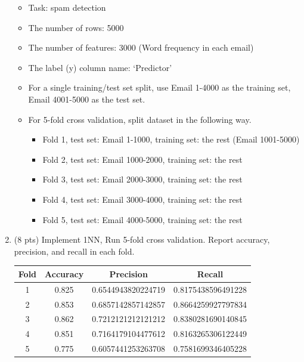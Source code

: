 \documentclass[a4paper]{article}
\theoremstyle{definition}
\newenvironment{soln}{
    \leavevmode\color{blue}\ignorespaces
}{}
\begin{document}
\begin{enumerate}
        \begin{itemize}
		\item Task: spam detection
		\item The number of rows: 5000
		\item The number of features: 3000 (Word frequency in each email)
		\item The label (y) column name: `Predictor'
		\item For a single training/test set split, use Email 1-4000 as the training set, Email 4001-5000 as the test set.
		\item For 5-fold cross validation, split dataset in the following way.
		\begin{itemize}
			\item Fold 1, test set: Email 1-1000, training set: the rest (Email 1001-5000)
			\item Fold 2, test set: Email 1000-2000, training set: the rest
			\item Fold 3, test set: Email 2000-3000, training set: the rest
			\item Fold 4, test set: Email 3000-4000, training set: the rest
			\item Fold 5, test set: Email 4000-5000, training set: the rest			
		\end{itemize}
	\end{itemize}
	
	\item (8 pts) Implement 1NN, Run 5-fold cross validation. Report accuracy, precision, and recall in each fold.
	
	\begin{soln}
            \begin{center}
            	\begin{tabular}{| c | c | c | c |}
            		\hline
            		Fold & Accuracy & Precision & Recall \\
            		\hline 1 & 0.825 & 0.6544943820224719 & 0.8175438596491228\\
            		\hline 2 & 0.853 & 0.6857142857142857 & 0.8664259927797834\\
            		\hline 3 & 0.862 & 0.7212121212121212 & 0.8380281690140845\\
            		\hline 4 & 0.851 & 0.7164179104477612 & 0.8163265306122449\\
            		\hline 5 & 0.775 & 0.6057441253263708 & 0.7581699346405228\\
            		\hline
            	\end{tabular}
            \end{center}
        \end{soln}
	

\end{enumerate}
\end{document}
